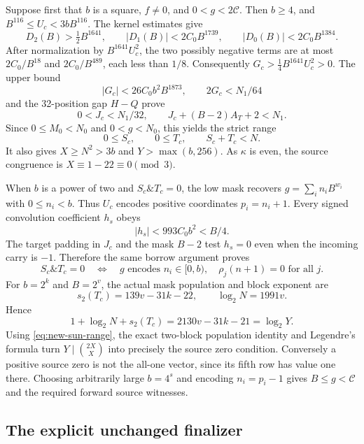 Suppose first that $b$ is a square, $f\ne0$, and
$0<g<2\mathcal C$. Then $b\ge4$, and
$B^{116}\le U_c<3bB^{116}$. The kernel estimates give
\[
 D_2(B)>\tfrac12B^{1641},\qquad
 |D_1(B)|<2C_0B^{1739},\qquad |D_0(B)|<2C_0B^{1384}.
\]
After normalization by $B^{1641}U_c^2$, the two possibly negative terms
are at most $2C_0/B^{18}$ and $2C_0/B^{489}$, each less than $1/8$.
Consequently $G_c>\tfrac14B^{1641}U_c^2>0$. The upper bound
\[
 |G_c|<26C_0b^2B^{1873},\qquad 2G_c<N_1/64
\]
and the 32-position gap $H-Q$ prove
\[
 0<J_c<N_1/32,\qquad J_c+(B-2)A_T+2<N_1.
\]
Since $0\le M_0<N_0$ and $0<g<N_0$, this yields the strict range
\begin{equation}
 0\le S_c,\qquad 0\le T_c,\qquad S_c+T_c<N.
 \label{eq:new-sun-range}
\end{equation}
It also gives $X\ge N^2>3b$ and $Y>\max(b,256)$. As $\kappa$ is even,
the source congruence is $X\equiv1-22\equiv0\pmod3$.

When $b$ is a power of two and $S_c\mathbin{\&}T_c=0$, the low mask recovers
$g=\sum_i n_iB^{w_i}$ with $0\le n_i<b$. Thus $U_c$ encodes positive
coordinates $p_i=n_i+1$. Every signed convolution coefficient $h_s$ obeys
\[
 |h_s|<993C_0b^2<B/4.
\]
The target padding in $J_c$ and the mask $B-2$ test $h_s=0$ even when
the incoming carry is $-1$. Therefore the same borrow argument proves
\[
 S_c\mathbin{\&}T_c=0
 \quad\Longleftrightarrow\quad
 g\text{ encodes }n_i\in[0,b),\quad \rho_j(n+1)=0\text{ for all }j.
\]
For $b=2^k$ and $B=2^v$, the actual mask population and block exponent are
\[
 s_2(T_c)=139v-31k-22,\qquad \log_2N=1991v.
\]
Hence
\[
 1+\log_2N+s_2(T_c)=2130v-31k-21=\log_2Y.
\]
Using \eqref{eq:new-sun-range}, the exact two-block population identity
and Legendre's formula turn $Y\mid\binom{2X}{X}$ into precisely the source
zero condition. Conversely a positive source zero is not the all-one
vector, since its fifth row has value one there. Choosing arbitrarily
large $b=4^s$ and encoding $n_i=p_i-1$ gives $B\le g<\mathcal C$ and
the required forward source witnesses.

\subsection{The explicit unchanged finalizer}


